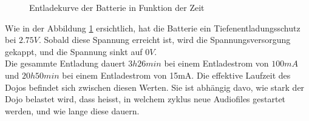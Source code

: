\begin{figure}[h]
	\caption{Entladekurve der Batterie in Funktion der Zeit}
	\label{fig:SpannungZuZeit}
\end{figure}

Wie in der Abbildung \ref{fig:SpannungZuZeit} ersichtlich, hat die Batterie ein Tiefenentladungsschutz bei $2.75V$. Sobald diese Spannung erreicht ist, wird die Spannungsversorgung gekappt, und die Spannung sinkt auf $0V$.\\
Die gesammte Entladung dauert $3h 26min$ bei einem Entladestrom von $100mA$ und $20h50min$ bei einem Entladestrom von 15mA. Die effektive Laufzeit des Dojos befindet sich zwischen diesen Werten. Sie ist abhängig davo, wie stark der Dojo belastet wird, dass heisst, in welchem zyklus neue Audiofiles gestartet werden, und wie lange diese dauern.

\newpage

